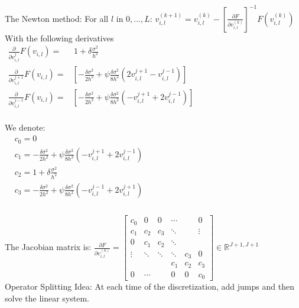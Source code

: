 \documentclass[8pt]{article}
\begin{document}
The Newton method: For all $l$ in ${0,...,L}$: $v^{(k+1)}_{i,l} =  v^{(k)}_{i,l} - \left[\frac{\partial{F}}{\partial{v^{(k)}_{i,l}}}\right]^{-1}F(v^{(k)}_{i,l})$ \\

With the following derivatives\\

$\begin{aligned}
\frac{\partial}{\partial v^j_{i,l}}F(v_{i,l}) = & \, 1 + \delta \frac{\sigma^2}{h^2} \,\\
\frac{\partial}{\partial v^{j+1}_{i,l}}F(v_{i,l}) = & \left[ -\frac{ \delta\sigma^2}{2h^2} + \psi \frac{\delta\sigma^2}{8h^2} (2v^{j+1}_{i,l} - v^{j-1}_{i,l}) \right] \, \\
\frac{\partial}{\partial v^{j-1}_{i,l}}F(v_{i,l}) = & \left[ -\frac{ \delta\sigma^2}{2h^2} + \psi \frac{\delta\sigma^2}{8h^2} (-v^{j+1}_{i,l} + 2v^{j-1}_{i,l}) \right]
\end{aligned}$ \\ \\

We denote:\\

$\begin{aligned}
& c_0 = 0 \\
&c_1 =  -\frac{ \delta\sigma^2}{2h^2} + \psi \frac{\delta\sigma^2}{8h^2} (-v_{i,l}^{j+1} + 2v_{i,l}^{j-1})\\
&c_2 = 1 + \delta \frac{\sigma^2}{h^2} \\
&c_3 = -\frac{ \delta\sigma^2}{2h^2} + \psi \frac{\delta\sigma^2}{8h^2} (-v_{i,l}^{j-1} + 2v_{i,l}^{j+1})\\
\end{aligned}$\\ \\

The Jacobian matrix is: $\frac{\partial{F}}{\partial{v^{(k)}_{i,l}}} = \begin{bmatrix}
c_0 & 0 & 0 & \cdots &  & 0 \\
c_1 & c_2 & c_3 & \ddots &  & \vdots \\
0 & c_1 & c_2 & \ddots &  &  \\
\vdots & \ddots & \ddots & \ddots & c_3 & 0 \\
 &  &  & c_1 & c_2 & c_3 \\
0 & \cdots &  & 0 & 0 & c_0
\end{bmatrix}
\in \mathbb{R}^{J+1,J+1}$\\


Operator Splitting Idea: At each time of the discretization, add jumps and then solve the linear system.\\
\end{document}
